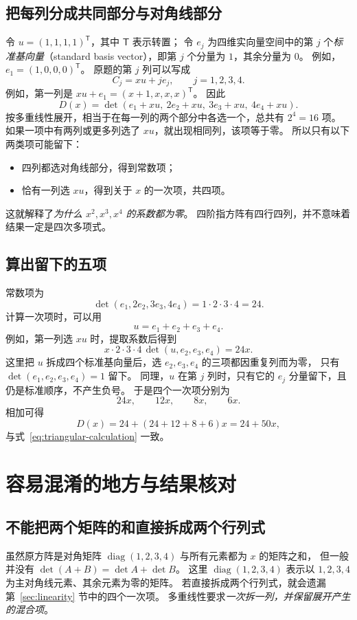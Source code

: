 \documentclass[UTF8,12pt,a4paper,fontset=fandol]{ctexart}
\begin{document}
\subsection{把每列分成共同部分与对角线部分}

令 $u=(1,1,1,1)^{\mathsf T}$，其中 $\mathsf T$ 表示转置；
令 $e_j$ 为四维实向量空间中的第 $j$ 个\emph{标准基向量}（standard basis vector），即第 $j$ 个分量为 $1$，其余分量为 $0$。
例如，$e_1=(1,0,0,0)^{\mathsf T}$。
原题的第 $j$ 列可以写成
\[
  C_j=xu+je_j,\qquad j=1,2,3,4.
\]
例如，第一列是 $xu+e_1=(x+1,x,x,x)^{\mathsf T}$。
因此
\[
  D(x)=\det(e_1+xu,\ 2e_2+xu,\ 3e_3+xu,\ 4e_4+xu).
\]
按多重线性展开，相当于在每一列的两个部分中各选一个，总共有 $2^4=16$ 项。
如果一项中有两列或更多列选了 $xu$，就出现相同列，该项等于零。
所以只有以下两类项可能留下：
\begin{itemize}
  \item 四列都选对角线部分，得到常数项；
  \item 恰有一列选 $xu$，得到关于 $x$ 的一次项，共四项。
\end{itemize}
这就解释了\emph{为什么 $x^2,x^3,x^4$ 的系数都为零}。
四阶指方阵有四行四列，并不意味着结果一定是四次多项式。

\subsection{算出留下的五项}

常数项为
\[
  \det(e_1,2e_2,3e_3,4e_4)=1\cdot2\cdot3\cdot4=24.
\]
计算一次项时，可以用
\[
  u=e_1+e_2+e_3+e_4.
\]
例如，第一列选 $xu$ 时，提取系数后得到
\[
  x\cdot2\cdot3\cdot4\,\det(u,e_2,e_3,e_4)=24x.
\]
这里把 $u$ 拆成四个标准基向量后，选 $e_2,e_3,e_4$ 的三项都因重复列而为零，
只有 $\det(e_1,e_2,e_3,e_4)=1$ 留下。
同理，$u$ 在第 $j$ 列时，只有它的 $e_j$ 分量留下，且仍是标准顺序，不产生负号。
于是四个一次项分别为
\[
  24x,\qquad12x,\qquad8x,\qquad6x.
\]
相加可得
\[
  D(x)=24+(24+12+8+6)x=24+50x,
\]
与式~\eqref{eq:triangular-calculation} 一致。

\section{容易混淆的地方与结果核对}

\subsection{不能把两个矩阵的和直接拆成两个行列式}

虽然原方阵是对角矩阵 $\operatorname{diag}(1,2,3,4)$ 与所有元素都为 $x$ 的矩阵之和，
但一般并没有 $\det(A+B)=\det A+\det B$。
这里 $\operatorname{diag}(1,2,3,4)$ 表示以 $1,2,3,4$ 为主对角线元素、其余元素为零的矩阵。
若直接拆成两个行列式，就会遗漏第~\ref{sec:linearity} 节中的四个一次项。
多重线性要求\emph{一次拆一列，并保留展开产生的混合项}。
\end{document}
